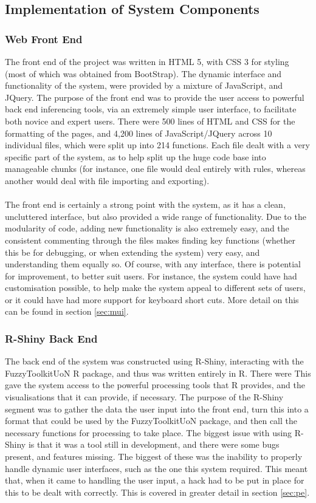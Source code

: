 \subsection{Implementation of System Components}
\tocless\subsubsection{Web Front End}
The front end of the project was written in HTML 5, with CSS 3 for styling (most of which was obtained from BootStrap). The dynamic interface and functionality of the system, were provided by a mixture of JavaScript, and JQuery. The purpose of the front end was to provide the user access to powerful back end inferencing tools, via an extremely simple user interface, to facilitate both novice and expert users. There were 500 lines of HTML and CSS for the formatting of the pages, and 4,200 lines of JavaScript/JQuery across 10 individual files, which were split up into 214 functions. Each file dealt with a very specific part of the system, as to help split up the huge code base into manageable chunks (for instance, one file would deal entirely with rules, whereas another would deal with file importing and exporting).\ \\
\ \\
The front end is certainly a strong point with the system, as it has a clean, uncluttered interface, but also provided a wide range of functionality. Due to the modularity of code, adding new functionality is also extremely easy, and the consistent commenting through the files makes finding key functions (whether this be for debugging, or when extending the system) very easy, and understanding them equally so. Of course, with any interface, there is potential for improvement, to better suit users. For instance, the system could have had customisation possible, to help make the system appeal to different sets of users, or it could have had more support for keyboard short cuts. More detail on this can be found in section \ref{sec:mui}.

\tocless\subsubsection{R-Shiny Back End}
The back end of the system was constructed using R-Shiny, interacting with the FuzzyToolkitUoN R package, and thus was written entirely in R. There were  This gave the system access to the powerful processing tools that R provides, and the visualisations that it can provide, if necessary. The purpose of the R-Shiny segment was to gather the data the user input into the front end, turn this into a format that could be used by the FuzzyToolkitUoN package, and then call the necessary functions for processing to take place. The biggest issue with using R-Shiny is that it was a tool still in development, and there were some bugs present, and features missing. The biggest of these was the inability to properly handle dynamic user interfaces, such as the one this system required. This meant that, when it came to handling the user input, a hack had to be put in place for this to be dealt with correctly. This is covered in greater detail in section \ref{sec:pe}.

